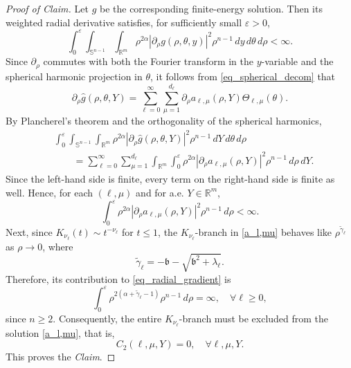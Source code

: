 \documentclass[12pt]{amsart}
\begin{document}
\begin{proof}[Proof of Claim]
Let $g$ be the corresponding finite-energy solution. Then its weighted radial derivative satisfies, for sufficiently small $\varepsilon>0$,
\begin{equation*}
\int_0^\varepsilon \int_{\mathbb S^{n-1}} \int_{\mathbb R^m} \rho^{2\alpha}|\partial_\rho g(\rho,\theta,y)|^2 \rho^{n-1}\, dy\, d\theta\, d\rho < \infty.
\end{equation*}
Since $\partial_\rho$ commutes with both the Fourier transform in the $y$-variable and the spherical harmonic projection in $\theta$, it follows from \eqref{eq_spherical_decom} that
\begin{equation}\label{eq_finite_energy}
    \partial_\rho \hat{g}(\rho,\theta,Y) =
\sum_{\ell=0}^{\infty}\sum_{\mu=1}^{d_\ell}\partial_\rho a_{\ell,\mu}(\rho,Y) \Theta_{\ell,\mu}(\theta).
\end{equation}
By Plancherel's theorem and the orthogonality of the spherical harmonics,
\begin{align*}
&\int_0^\varepsilon \int_{\mathbb S^{n-1}} \int_{\mathbb R^m} \rho^{2\alpha}|\partial_\rho \hat{g}(\rho,\theta,Y)|^2 \rho^{n-1}\, dY\, d\theta\, d\rho\\
&\qquad = \sum_{\ell=0}^{\infty} \sum_{\mu=1}^{d_\ell} \int_{\mathbb R^m} \int_0^\varepsilon \rho^{2\alpha} |\partial_\rho a_{\ell,\mu}(\rho,Y)|^2 \rho^{n-1}\, d\rho\, dY.
\end{align*}
Since the left-hand side is finite, every term on the right-hand side is finite as well. Hence, for each $(\ell,\mu)$ and for a.e. $Y\in \mathbb{R}^m$,
\begin{equation}\label{eq_radial_gradient}
\int_0^\varepsilon \rho^{2\alpha} |\partial_\rho a_{\ell,\mu} (\rho,Y)|^2 \rho^{n-1}\, d\rho < \infty.
\end{equation}
Next, since $K_{\nu_\ell}(t) \sim t^{-\nu_\ell}$ for $t\le 1$, the $K_{\nu_\ell}$-branch in \eqref{a_l,mu} behaves like $\rho^{\widetilde{\gamma}_\ell}$ as $\rho \to 0$, where
\begin{equation*}
    \widetilde{\gamma}_\ell = -\mathfrak b - \sqrt{\mathfrak b^2 + \lambda_\ell}.
\end{equation*}
Therefore, its contribution to \eqref{eq_radial_gradient} is
\begin{equation*}
    \int_0^\varepsilon \rho^{2(\alpha + \widetilde{\gamma}_\ell -1 ) } \rho^{n-1}\, d\rho = \infty,\quad \forall \ell \ge 0,
\end{equation*}
since $n\ge 2$. Consequently, the entire $K_{\nu_\ell}$-branch must be excluded from the solution \eqref{a_l,mu}, that is,
\begin{equation*}
    C_2(\ell,\mu,Y) = 0,\quad \forall \ell,\mu,Y.
\end{equation*}
This proves the \textit{Claim}.
\end{proof}
\end{document}
